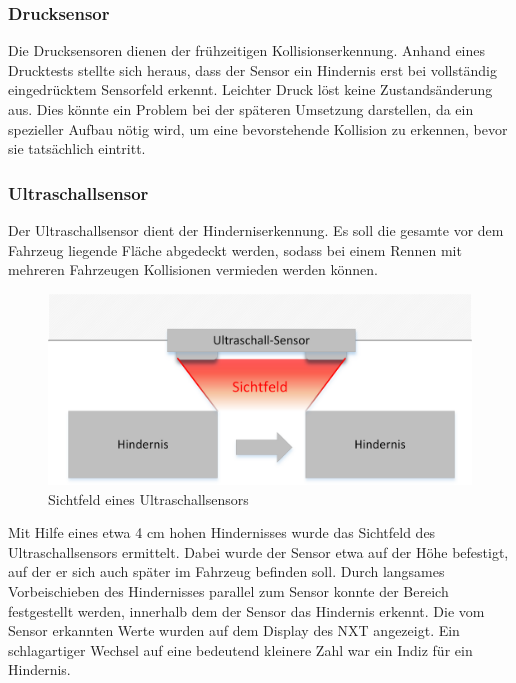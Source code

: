 \documentclass[a4paper,12pt]{article}                                         %
\numberwithin{table}{section}                               %
\numberwithin{figure}{section}                              %
\begin{document}
	\subsubsection{Drucksensor}
	Die Drucksensoren dienen der frühzeitigen Kollisionserkennung. Anhand eines Drucktests stellte sich heraus, dass der Sensor ein Hindernis erst bei vollständig eingedrücktem Sensorfeld erkennt. Leichter Druck löst keine Zustandsänderung aus. Dies könnte ein Problem bei der späteren Umsetzung darstellen, da ein spezieller Aufbau nötig wird, um eine bevorstehende Kollision zu erkennen, bevor sie tatsächlich eintritt. 
	
	\subsubsection{Ultraschallsensor}
	Der Ultraschallsensor dient der Hinderniserkennung. Es soll die gesamte vor dem Fahrzeug liegende Fläche abgedeckt werden, sodass bei einem Rennen mit mehreren Fahrzeugen Kollisionen vermieden werden können. \\
	
	\begin{figure}[h]
		\begin{center}
			\includegraphics{../Bilder/Ultraschallsensor.png}
		\end{center}
		\caption{Sichtfeld eines Ultraschallsensors}
	\end{figure}
	
	Mit Hilfe eines etwa 4 cm hohen Hindernisses wurde das Sichtfeld des Ultraschallsensors ermittelt. Dabei wurde der Sensor etwa auf der Höhe befestigt, auf der er sich auch später im Fahrzeug befinden soll. Durch langsames Vorbeischieben des Hindernisses parallel zum Sensor konnte der Bereich festgestellt werden, innerhalb dem der Sensor das Hindernis erkennt. Die vom Sensor erkannten Werte wurden auf dem Display des NXT angezeigt. Ein schlagartiger Wechsel auf eine bedeutend kleinere Zahl war ein Indiz für ein Hindernis. 
	
\end{document}

